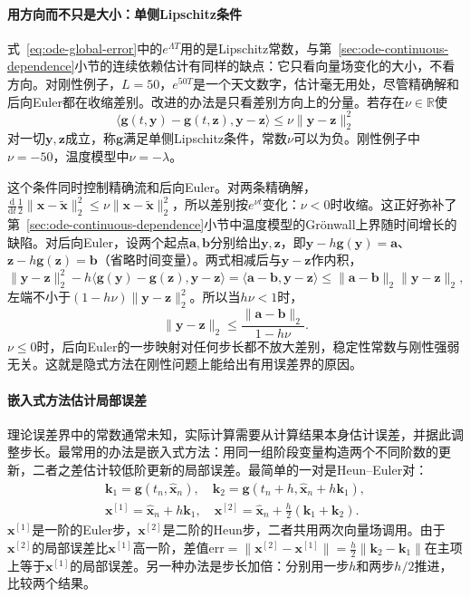 \paragraph{用方向而不只是大小：单侧Lipschitz条件}
式~\eqref{eq:ode-global-error}中的$e^{\Lambda T}$用的是Lipschitz常数，与第~\ref{sec:ode-continuous-dependence}小节的连续依赖估计有同样的缺点：它只看向量场变化的大小，不看方向。对刚性例子，$L=50$，$e^{50T}$是一个天文数字，估计毫无用处，尽管精确解和后向Euler都在收缩差别。改进的办法是只看差别方向上的分量。若存在$\nu\in\mathbb R$使
\[
  \bigl\langle\bm g(t,\bm y)-\bm g(t,\bm z),\bm y-\bm z\bigr\rangle\leq\nu\|\bm y-\bm z\|_2^2
\]
对一切$\bm y,\bm z$成立，称$\bm g$满足单侧Lipschitz条件，常数$\nu$可以为负。刚性例子中$\nu=-50$，温度模型中$\nu=-\lambda$。

这个条件同时控制精确流和后向Euler。对两条精确解，$\frac{\mathrm d}{\mathrm dt}\frac12\|\bm x-\widetilde{\bm x}\|_2^2\leq\nu\|\bm x-\widetilde{\bm x}\|_2^2$，所以差别按$e^{\nu t}$变化：$\nu<0$时收缩。这正好弥补了第~\ref{sec:ode-continuous-dependence}小节中温度模型的Grönwall上界随时间增长的缺陷。对后向Euler，设两个起点$\bm a,\bm b$分别给出$\bm y,\bm z$，即$\bm y-h\bm g(\bm y)=\bm a$、$\bm z-h\bm g(\bm z)=\bm b$（省略时间变量）。两式相减后与$\bm y-\bm z$作内积，
\[
  \|\bm y-\bm z\|_2^2-h\bigl\langle\bm g(\bm y)-\bm g(\bm z),\bm y-\bm z\bigr\rangle=\langle\bm a-\bm b,\bm y-\bm z\rangle\leq\|\bm a-\bm b\|_2\|\bm y-\bm z\|_2,
\]
左端不小于$(1-h\nu)\|\bm y-\bm z\|_2^2$。所以当$h\nu<1$时，
\[
  \|\bm y-\bm z\|_2\leq\frac{\|\bm a-\bm b\|_2}{1-h\nu}.
\]
$\nu\leq0$时，后向Euler的一步映射对任何步长都不放大差别，稳定性常数与刚性强弱无关。这就是隐式方法在刚性问题上能给出有用误差界的原因。

\paragraph{嵌入式方法估计局部误差}
理论误差界中的常数通常未知，实际计算需要从计算结果本身估计误差，并据此调整步长。最常用的办法是嵌入式方法：用同一组阶段变量构造两个不同阶数的更新，二者之差估计较低阶更新的局部误差。最简单的一对是Heun--Euler对：
\[
  \begin{gathered}
  \bm k_1=\bm g(t_n,\widehat{\bm x}_n),\quad\bm k_2=\bm g(t_n+h,\widehat{\bm x}_n+h\bm k_1),\\
  \bm x^{[1]}=\widehat{\bm x}_n+h\bm k_1,\quad\bm x^{[2]}=\widehat{\bm x}_n+\frac h2(\bm k_1+\bm k_2).
  \end{gathered}
\]
$\bm x^{[1]}$是一阶的Euler步，$\bm x^{[2]}$是二阶的Heun步，二者共用两次向量场调用。由于$\bm x^{[2]}$的局部误差比$\bm x^{[1]}$高一阶，差值$\mathrm{err}=\|\bm x^{[2]}-\bm x^{[1]}\|=\frac h2\|\bm k_2-\bm k_1\|$在主项上等于$\bm x^{[1]}$的局部误差。另一种办法是步长加倍：分别用一步$h$和两步$h/2$推进，比较两个结果。

